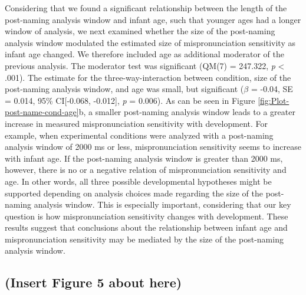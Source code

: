 \documentclass[man]{apa6}
\theoremstyle{definition}
\theoremstyle{definition}
\theoremstyle{definition}
\theoremstyle{remark}
\begin{document}
Considering that we found a significant relationship between the length
of the post-naming analysis window and infant age, such that younger
ages had a longer window of analysis, we next examined whether the size
of the post-naming analysis window modulated the estimated size of
mispronunciation sensitivity as infant age changed. We therefore
included age as additional moderator of the previous analysis. The
moderator test was significant (QM(7) = 247.322, \emph{p} \textless{}
.001). The estimate for the three-way-interaction between condition,
size of the post-naming analysis window, and age was small, but
significant (\(\beta\) = -0.04, SE = 0.014, 95\% CI{[}-0.068, -0.012{]},
\emph{p} = 0.006). As can be seen in Figure
\ref{fig:Plot-post-name-cond-age}b, a smaller post-naming analysis
window leads to a greater increase in measured mispronunciation
sensitivity with development. For example, when experimental conditions
were analyzed with a post-naming analysis window of 2000 ms or less,
mispronunciation sensitivity seems to increase with infant age. If the
post-naming analysis window is greater than 2000 ms, however, there is
no or a negative relation of mispronunciation sensitivity and age. In
other words, all three possible developmental hypotheses might be
supported depending on analysis choices made regarding the size of the
post-naming analysis window. This is especially important, considering
that our key question is how mispronunciation sensitivity changes with
development. These results suggest that conclusions about the
relationship between infant age and mispronunciation sensitivity may be
mediated by the size of the post-naming analysis window.

\subsection{(Insert Figure 5 about
here)}\label{insert-figure-5-about-here}
\end{document}
